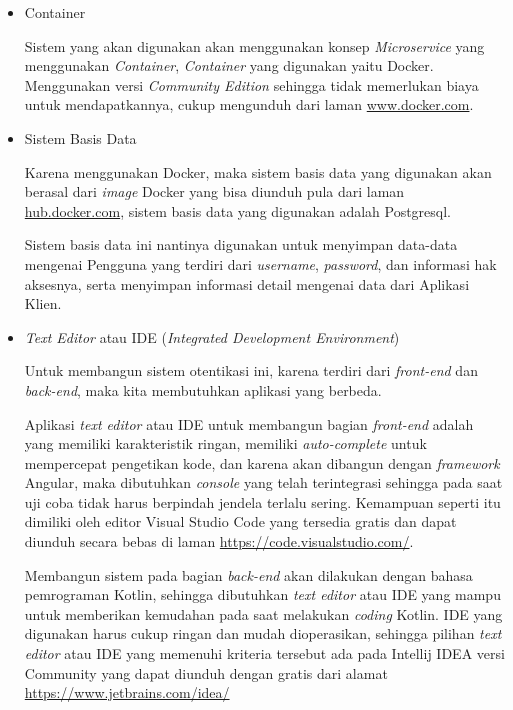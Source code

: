 \documentclass[pdftex,12pt, oneside]{article}
\begin{document}
\begin{itemize}
	\item Container
	
Sistem yang akan digunakan akan menggunakan konsep \textit{Microservice} yang menggunakan \textit{Container}, \textit{Container} yang digunakan yaitu Docker. Menggunakan versi \textit{Community Edition} sehingga tidak memerlukan biaya untuk mendapatkannya, cukup mengunduh dari laman \url{www.docker.com}.

	\item Sistem Basis Data
	
Karena menggunakan Docker, maka sistem basis data yang digunakan akan berasal dari \textit{image} Docker yang bisa diunduh pula dari laman \url{hub.docker.com}, sistem basis data yang digunakan adalah Postgresql.

Sistem basis data ini nantinya digunakan untuk menyimpan data-data mengenai Pengguna yang terdiri dari \textit{username}, \textit{password}, dan informasi hak aksesnya, serta menyimpan informasi detail mengenai data dari Aplikasi Klien.
	
	\item \textit{Text Editor} atau IDE (\textit{Integrated Development Environment})
	
Untuk membangun sistem otentikasi ini, karena terdiri dari \textit{front-end} dan \textit{back-end}, maka kita membutuhkan aplikasi yang berbeda. 

Aplikasi \textit{text editor} atau IDE untuk membangun bagian \textit{front-end} adalah yang memiliki karakteristik ringan, memiliki \textit{auto-complete} untuk mempercepat pengetikan kode, dan karena akan dibangun dengan \textit{framework} Angular, maka dibutuhkan \textit{console} yang telah terintegrasi sehingga pada saat uji coba tidak harus berpindah jendela terlalu sering. Kemampuan seperti itu dimiliki oleh editor Visual Studio Code yang tersedia gratis dan dapat diunduh secara bebas di laman \href{https://code.visualstudio.com/}{https://code.visualstudio.com/}.

Membangun sistem pada bagian \textit{back-end} akan dilakukan dengan bahasa pemrograman Kotlin, sehingga dibutuhkan \textit{text editor} atau IDE yang mampu untuk memberikan kemudahan pada saat melakukan \textit{coding} Kotlin. IDE yang digunakan harus cukup ringan dan mudah dioperasikan, sehingga pilihan \textit{text editor} atau IDE yang memenuhi kriteria tersebut ada pada Intellij IDEA versi Community yang dapat diunduh dengan gratis dari alamat \href{https://www.jetbrains.com/idea/}{https://www.jetbrains.com/idea/}


\end{itemize}
\end{document}
